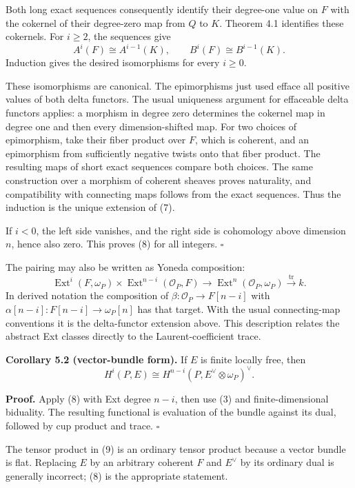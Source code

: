 \documentclass[11pt]{article}
\begin{document}
Both long exact sequences consequently identify their degree-one value
on \(F\) with the cokernel of their degree-zero map from \(Q\) to \(K\).
Theorem 4.1 identifies these cokernels. For \(i\geq2\), the sequences
give \[
A^i(F)\cong A^{i-1}(K),
\qquad B^i(F)\cong B^{i-1}(K).
\] Induction gives the desired isomorphisms for every \(i\geq0\).

These isomorphisms are canonical. The epimorphisms just used efface all
positive values of both delta functors. The usual uniqueness argument
for effaceable delta functors applies: a morphism in degree zero
determines the cokernel map in degree one and then every
dimension-shifted map. For two choices of epimorphism, take their fiber
product over \(F\), which is coherent, and an epimorphism from
sufficiently negative twists onto that fiber product. The resulting maps
of short exact sequences compare both choices. The same construction
over a morphism of coherent sheaves proves naturality, and compatibility
with connecting maps follows from the exact sequences. Thus the
induction is the unique extension of (7).

If \(i<0\), the left side vanishes, and the right side is cohomology
above dimension \(n\), hence also zero. This proves (8) for all
integers. \(\square\)

The pairing may also be written as Yoneda composition: \[
\operatorname{Ext}^i(F,\omega_P)\times
\operatorname{Ext}^{n-i}(\mathcal O_P,F)
 \longrightarrow\operatorname{Ext}^{n}(\mathcal O_P,\omega_P)
 \xrightarrow{\operatorname{tr}}k.
\] In derived notation the composition of
\(\beta:\mathcal O_P\to F[n-i]\) with
\(\alpha[n-i]:F[n-i]\to\omega_P[n]\) has that target. With the usual
connecting-map conventions it is the delta-functor extension above. This
description relates the abstract Ext classes directly to the
Laurent-coefficient trace.

\textbf{Corollary 5.2 (vector-bundle form).} If \(E\) is finite locally
free, then \[
H^i(P,E)\cong H^{n-i}(P,E^\vee\otimes\omega_P)^\vee.
\tag{9}
\]

\textbf{Proof.} Apply (8) with Ext degree \(n-i\), then use (3) and
finite-dimensional biduality. The resulting functional is evaluation of
the bundle against its dual, followed by cup product and trace.
\(\square\)

The tensor product in (9) is an ordinary tensor product because a vector
bundle is flat. Replacing \(E\) by an arbitrary coherent \(F\) and
\(E^\vee\) by its ordinary dual is generally incorrect; (8) is the
appropriate statement.
\end{document}
